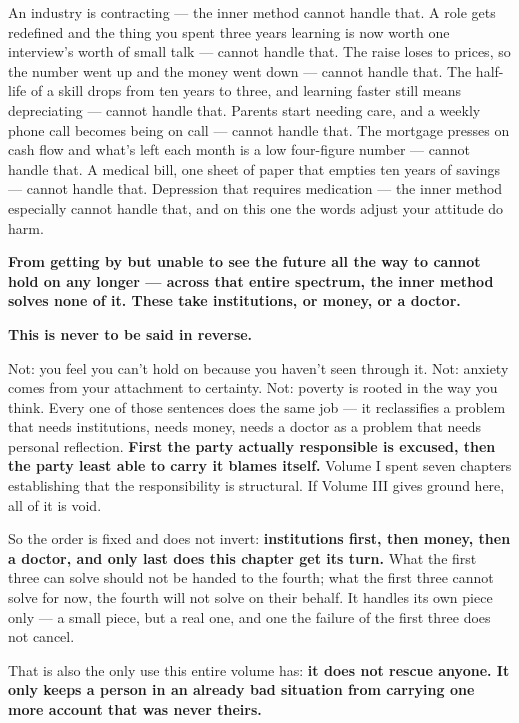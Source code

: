 \documentclass[11pt,a4paper]{article}
\begin{document}
An industry is contracting --- the inner method cannot handle that. A role gets redefined and the thing you spent three years learning is now worth one interview's worth of small talk --- cannot handle that. The raise loses to prices, so the number went up and the money went down --- cannot handle that. The half-life of a skill drops from ten years to three, and learning faster still means depreciating --- cannot handle that. Parents start needing care, and a weekly phone call becomes being on call --- cannot handle that. The mortgage presses on cash flow and what's left each month is a low four-figure number --- cannot handle that. A medical bill, one sheet of paper that empties ten years of savings --- cannot handle that. Depression that requires medication --- the inner method especially cannot handle that, and on this one the words adjust your attitude do harm.

\textbf{From getting by but unable to see the future all the way to cannot hold on any longer --- across that entire spectrum, the inner method solves none of it. These take institutions, or money, or a doctor.}

\textbf{This is never to be said in reverse.}

Not: you feel you can't hold on because you haven't seen through it. Not: anxiety comes from your attachment to certainty. Not: poverty is rooted in the way you think. Every one of those sentences does the same job --- it reclassifies a problem that needs institutions, needs money, needs a doctor as a problem that needs personal reflection. \textbf{First the party actually responsible is excused, then the party least able to carry it blames itself.} Volume I spent seven chapters establishing that the responsibility is structural. If Volume III gives ground here, all of it is void.

So the order is fixed and does not invert: \textbf{institutions first, then money, then a doctor, and only last does this chapter get its turn.} What the first three can solve should not be handed to the fourth; what the first three cannot solve for now, the fourth will not solve on their behalf. It handles its own piece only --- a small piece, but a real one, and one the failure of the first three does not cancel.

That is also the only use this entire volume has: \textbf{it does not rescue anyone. It only keeps a person in an already bad situation from carrying one more account that was never theirs.}
\end{document}
